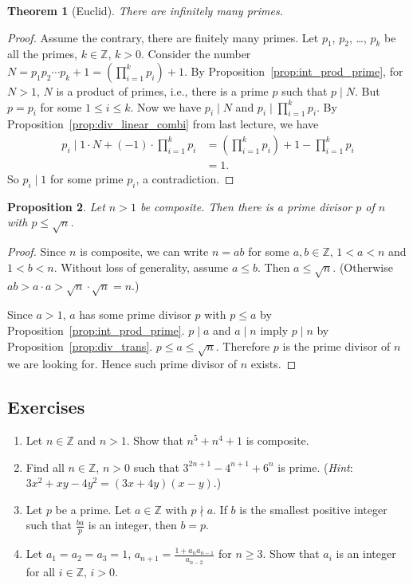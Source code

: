 \documentclass{amsbook}
\theoremstyle{plain}
\newtheorem{theorem}{Theorem}[chapter] %
\newtheorem{proposition}[theorem]{Proposition}
\theoremstyle{definition}
\theoremstyle{remark}
\numberwithin{equation}{chapter}
\numberwithin{figure}{chapter}
\newcommand{\Z}{\mathbb{Z}}
\begin{document}
\begin{theorem}[Euclid]
There are infinitely many primes.
\end{theorem}
\begin{proof}
Assume the contrary, there are finitely many primes. Let $p_1$, $p_2$, \ldots, $p_k$ be all the primes, $k \in \mathbb{Z}$, $k > 0$. Consider the number $N = p_1p_2 \cdots p_k + 1= \left(\prod_{i=1}^k p_i\right) + 1$. By Proposition~\ref{prop:int_prod_prime}, for $N > 1$, $N$ is a product of primes, i.e., there is a prime $p$ such that $p \mid N$. But $p = p_i$ for some $1 \leqslant i \leqslant k$. Now we have $p_i \mid N$ and $p_i \mid \prod_{i=1}^k p_i$. By Proposition~\ref{prop:div_linear_combi} from last lecture, we have 
\begin{align}
p_i \mid 1 \cdot N + (-1) \cdot \prod_{i=1}^k p_i &= \left(\prod_{i=1}^k p_i\right) + 1 - \prod_{i=1}^k p_i \\
                                                  &= 1.
\end{align}
So $p_i \mid 1$ for some prime $p_i$, a contradiction.
\end{proof}

\begin{proposition}\label{prop:p_le_sqrtn}
Let $n > 1$ be composite. Then there is a prime divisor $p$ of $n$ with $p \leqslant \sqrt{n}$.
\end{proposition}
\begin{proof}
  Since $n$ is composite, we can write $n = ab$ for some $a, b \in \mathbb{Z}$, $1 < a < n$ and $1 < b < n$. Without loss of generality, assume $a \leqslant b$. Then $a \leqslant \sqrt n$. (Otherwise $ab > a \cdot a > \sqrt n \cdot \sqrt n = n$.) 

Since $a > 1$, $a$ has some prime divisor $p$ with $p \leqslant a$ by Proposition~\ref{prop:int_prod_prime}. $p \mid a$ and $a \mid n$ imply $p \mid n$ by Proposition~\ref{prop:div_trans}. $p \leqslant a \leqslant \sqrt n$. Therefore $p$ is the prime divisor of $n$ we are looking for. Hence such prime divisor of $n$ exists.
\end{proof}

\subsection*{Exercises}
\begin{enumerate}
\item Let $n \in \Z$ and $n > 1$. Show that $n^5 + n^4 + 1$ is composite.
\item Find all $n \in \Z$, $n > 0$ such that $3^{2n+1} - 4^{n+1} + 6^n$ is prime. (\emph{Hint}: $3x^2 + xy - 4y^2 = (3x+4y) (x-y)$.)
\item Let $p$ be a prime. Let $a \in \Z$ with $p \nmid a$. If $b$ is the smallest positive integer such that $\frac{ba}p$ is an integer, then $b = p$.
\item Let $a_1 = a_2 = a_3 = 1$, $\displaystyle a_{n+1} = \frac{1 + a_n a_{n-1}}{a_{n-2}}$ for $n \geqslant 3$. Show that $a_i$ is an integer for all $i \in \Z$, $i > 0$.
\end{enumerate}
\end{document}
